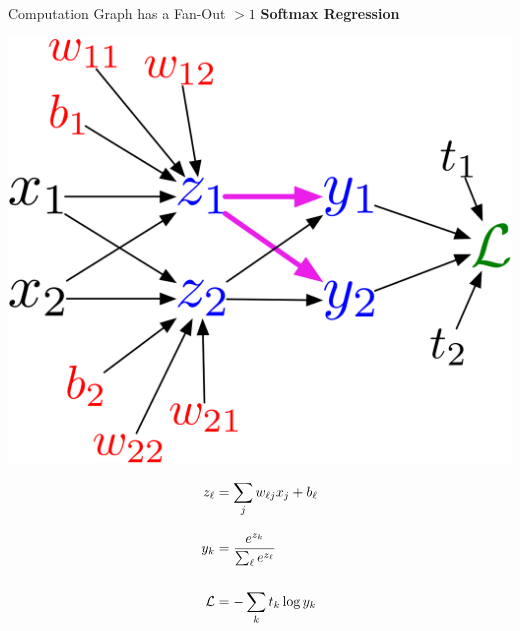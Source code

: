 \documentclass[handout,aspectratio=169]{beamer}
\begin{document}
\begin{frame}{Computation Graph has a Fan-Out $> 1$}
{\bf Softmax Regression}
\smallskip

\begin{minipage}{0.7\textwidth}
\centering
\includegraphics[width=0.7\linewidth]{pics/multiway_graph.png}

\end{minipage}\begin{minipage}{0.3\textwidth}
\centering
    \begin{align*}
      z_{\ell} &= \sum_{j} w_{\ell j} x_{j} + b_{\ell} \\[3mm]
      y_{k} &= \frac{e^{z_{k}}}{\sum_{\ell} e^{z_{\ell}}} \\[5mm]
      {\cal L} &= -\sum_{k} t_{k} \log y_{k}
    \end{align*}
\end{minipage}
\end{frame}
\end{document}

